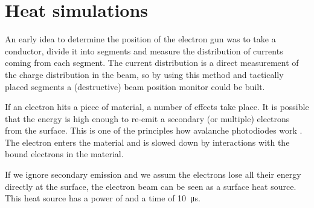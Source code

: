 \chapter{Heat simulations}
\label{sec:heatsims}
An early idea to determine the position of the electron gun was to take a conductor, divide it into segments and measure the distribution of currents coming from each segment. 
The current distribution is a direct measurement of the charge distribution in the beam, so by using this method and tactically placed segments a (destructive) beam position monitor could be built.

If an electron hits a piece of material, a number of effects take place. 
It is possible that the energy is high enough to re-emit a secondary (or multiple) electrons from the surface. This is one of the principles how avalanche photodiodes work \red{[citation?]}.
The electron enters the material and is slowed down by interactions with the bound  electrons in the material. 



If we ignore secondary emission  and we assum the electrons lose all their energy directly at the surface, the electron beam can be seen as a surface heat source. This heat source has a power of  and a time of \SI{10}{\micro\second}.
